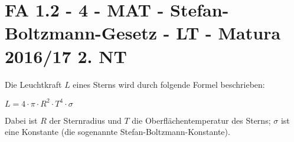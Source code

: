 \section{FA 1.2 - 4 - MAT - Stefan-Boltzmann-Gesetz - LT - Matura 2016/17 2. NT}

\begin{beispiel}[FA 1.2]{1} %
Die Leuchtkraft $L$ eines Sterns wird durch folgende Formel beschrieben:

$L=4\cdot\pi\cdot R^2\cdot T^4\cdot\sigma$

Dabei ist $R$ der Sternradius und $T$ die Oberflächentemperatur des Sterns; $\sigma$ ist eine Konstante (die sogenannte Stefan-Boltzmann-Konstante).

\end{beispiel}